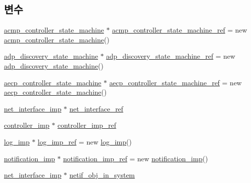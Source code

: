 \subsection*{변수}
\begin{DoxyCompactItemize}
\item 
\hyperlink{classavdecc__lib_1_1acmp__controller__state__machine}{acmp\+\_\+controller\+\_\+state\+\_\+machine} $\ast$ \hyperlink{namespaceavdecc__lib_a693c2049de1d4ec860a92126b846ac21}{acmp\+\_\+controller\+\_\+state\+\_\+machine\+\_\+ref} = new \hyperlink{classavdecc__lib_1_1acmp__controller__state__machine}{acmp\+\_\+controller\+\_\+state\+\_\+machine}()
\item 
\hyperlink{classavdecc__lib_1_1adp__discovery__state__machine}{adp\+\_\+discovery\+\_\+state\+\_\+machine} $\ast$ \hyperlink{namespaceavdecc__lib_aa33697f1203280924134bb7fdcc76129}{adp\+\_\+discovery\+\_\+state\+\_\+machine\+\_\+ref} = new \hyperlink{classavdecc__lib_1_1adp__discovery__state__machine}{adp\+\_\+discovery\+\_\+state\+\_\+machine}()
\item 
\hyperlink{classavdecc__lib_1_1aecp__controller__state__machine}{aecp\+\_\+controller\+\_\+state\+\_\+machine} $\ast$ \hyperlink{namespaceavdecc__lib_a0b1b5aea3c0490f77cbfd9178af5be22}{aecp\+\_\+controller\+\_\+state\+\_\+machine\+\_\+ref} = new \hyperlink{classavdecc__lib_1_1aecp__controller__state__machine}{aecp\+\_\+controller\+\_\+state\+\_\+machine}()
\item 
\hyperlink{classavdecc__lib_1_1net__interface__imp}{net\+\_\+interface\+\_\+imp} $\ast$ \hyperlink{namespaceavdecc__lib_adb4da03bc65b7846cc240ee919bbde19}{net\+\_\+interface\+\_\+ref}
\item 
\hyperlink{classavdecc__lib_1_1controller__imp}{controller\+\_\+imp} $\ast$ \hyperlink{namespaceavdecc__lib_ac8771a60b14cca3f0e41704835ac30ec}{controller\+\_\+imp\+\_\+ref}
\item 
\hyperlink{classavdecc__lib_1_1log__imp}{log\+\_\+imp} $\ast$ \hyperlink{namespaceavdecc__lib_acbe3e2a96ae6524943ca532c87a28529}{log\+\_\+imp\+\_\+ref} = new \hyperlink{classavdecc__lib_1_1log__imp}{log\+\_\+imp}()
\item 
\hyperlink{classavdecc__lib_1_1notification__imp}{notification\+\_\+imp} $\ast$ \hyperlink{namespaceavdecc__lib_aca078f7550e970a17b3f732c26bc3d83}{notification\+\_\+imp\+\_\+ref} = new \hyperlink{classavdecc__lib_1_1notification__imp}{notification\+\_\+imp}()
\item 
\hyperlink{classavdecc__lib_1_1net__interface__imp}{net\+\_\+interface\+\_\+imp} $\ast$ \hyperlink{namespaceavdecc__lib_aa02659d86782158e7934e97da042e57a}{netif\+\_\+obj\+\_\+in\+\_\+system}

\end{DoxyCompactItemize}
